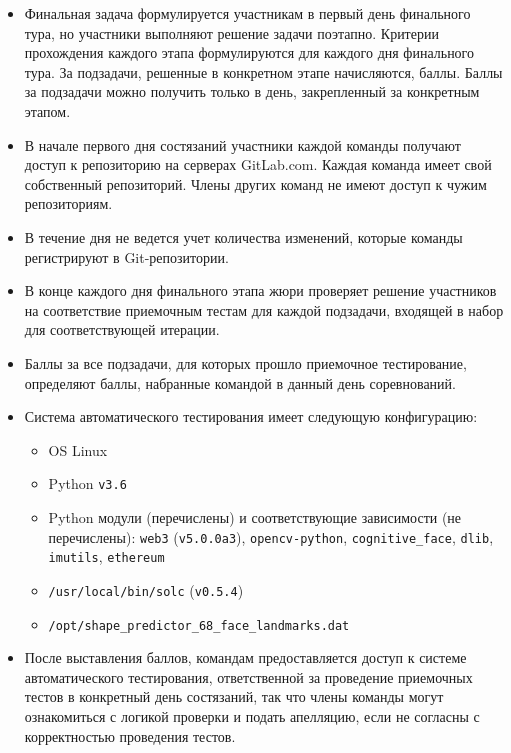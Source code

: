 \begin{itemize}
    \item Финальная задача формулируется участникам в первый день финального тура,
    но участники выполняют решение  задачи поэтапно. Критерии прохождения каждого
    этапа формулируются для каждого дня финального тура. За подзадачи, решенные в
    конкретном этапе начисляются, баллы. Баллы за подзадачи можно получить только
    в день, закрепленный за конкретным этапом.

    \item В начале первого дня состязаний участники каждой команды получают доступ 
    к репозиторию на серверах GitLab.com. Каждая команда имеет свой собственный 
    репозиторий. Члены других команд не имеют доступ к чужим репозиториям.

    \item В течение дня не ведется учет количества изменений, которые команды
    регистрируют в Git-репозитории.

    \item В конце каждого дня финального этапа жюри проверяет решение участников
    на соответствие приемочным тестам для каждой подзадачи, входящей в набор
    для соответствующей итерации.

    \item Баллы за все подзадачи, для которых прошло приемочное тестирование,
    определяют баллы, набранные командой в данный день соревнований.

    \item Система автоматического тестирования имеет следующую конфигурацию:
    \begin{itemize}
        \item OS Linux
        \item Python \texttt{v3.6}
        \item Python модули (перечислены) и соответствующие зависимости
        (не перечислены): \texttt{web3} (\texttt{v5.0.0a3}), \texttt{opencv-python}, 
        \texttt{cognitive\_face}, \texttt{dlib},  \texttt{imutils}, 
        \texttt{ethereum}
        \item \texttt{/usr/local/bin/solc} (\texttt{v0.5.4})
        \item \texttt{/opt/shape\_predictor\_68\_face\_landmarks.dat}
    \end{itemize}

    \item После выставления баллов, командам предоставляется доступ к системе
    автоматического тестирования, ответственной за проведение приемочных тестов в
    конкретный день состязаний, так что члены команды могут ознакомиться с 
    логикой проверки и подать апелляцию, если не согласны с корректностью проведения
    тестов.


\end{itemize}
